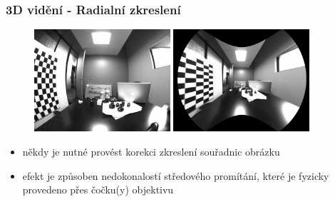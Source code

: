 \begin{frame}
\frametitle{3D vidění - Radialní zkreslení}

\begin{figure}[h]
 \centering
 \includegraphics[width=0.45\textwidth]{./fig17}
 \includegraphics[width=0.45\textwidth]{./fig16}
 \end{figure}
\begin{itemize}

\item někdy je nutné provést korekci zkreslení souřadnic obrázku
\item efekt je způsoben nedokonalostí středového promítání, které je fyzicky provedeno přes čočku(y) objektivu
\end{itemize}
\end{frame}

